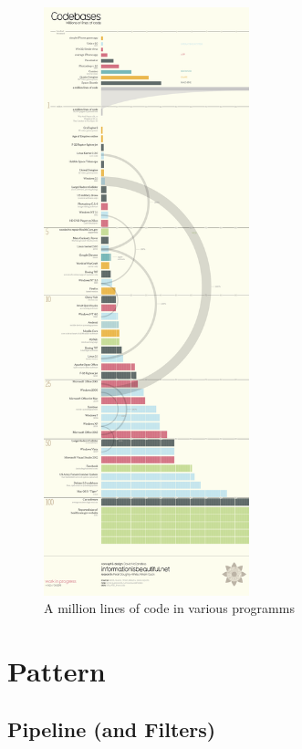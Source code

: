 \documentclass[a4paper,12pt]{scrreprt}
\begin{document}
\cite{Buschmann1996}\cite{Fowler2002}


\begin{figure}
	\begin{center}
	\includegraphics[width=0.53\textwidth]{images/LoC}
	\end{center}
		
	\caption[Million lines of Code]{A million lines of code in various programms}
	\label{fig:Lines}
\end{figure}


\chapter{Pattern}
\section{Pipeline (and Filters)}
\end{document}
